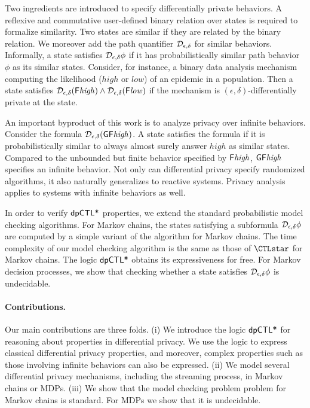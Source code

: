 
Two ingredients are introduced to specify differentially private
behaviors. A reflexive and commutative user-defined binary relation
over states is required to formalize similarity. Two states are
similar if they are related by the binary relation. We moreover add
the path quantifier $\mathcal{D}_{{\epsilon}, {\delta}}$ for similar
behaviors. Informally, a state satisfies $\mathcal{D}_{{\epsilon}, {\delta}}
\phi$ if it has probabilistically similar path behavior $\phi$ as
its similar states. Consider, for instance, a binary data analysis
mechanism computing the likelihood ($\mathit{high}$ or $\mathit{low}$)
of an epidemic in a population. Then a state satisfies
$\mathcal{D}_{{\epsilon}, {\delta}} (\mathsf{F} \mathit{high}) \wedge
\mathcal{D}_{{\epsilon}, {\delta}} (\mathsf{F} \mathit{low})$ if the mechanism is
$(\epsilon, \delta)$-differentially private at the state.


An important byproduct of this work is to analyze privacy over
infinite behaviors. Consider the formula $\mathcal{D}_{{\epsilon}, {\delta}}
(\mathsf{G} \mathsf{F} \mathit{high})$. A state satisfies the formula if it
is probabilistically similar to always almost surely
answer $\mathit{high}$ as similar states. Compared to the unbounded
but finite behavior specified by $\mathsf{F} \mathit{high}$,
$\mathsf{G} \mathsf{F} \mathit{high}$ specifies an infinite behavior.
Not only can differential privacy specify randomized algorithms, it
also naturally generalizes to reactive systems.
Privacy analysis applies to systems with infinite behaviors as well.


In order to verify $\textsf{dpCTL*}$ properties, we extend the standard
probabilistic model checking algorithms. For Markov chains, the states
satisfying a subformula $\mathcal{D}_{{\epsilon}, {\delta}} \phi$ are computed
by a simple variant of the algorithm for Markov chains.
The time complexity of our model checking algorithm is the same as
those of $\CTLstar$ for Markov chains. The logic $\textsf{dpCTL*}$ obtains its
expressiveness for free. 
For Markov decision processes, we show that checking whether a state
satisfies $\mathcal{D}_{{\epsilon}, {\delta}} \phi$ is undecidable.


\paragraph{Contributions.} Our main contributions are three folds. (i)
We introduce the logic $\textsf{dpCTL*}$ for reasoning about properties in 
differential privacy. We use the logic to express classical
differential privacy properties, and moreover, complex properties such as those 
involving infinite behaviors can also be expressed. (ii) We model several differential privacy mechanisms, including the streaming process, in Markov chains or MDPs.
(iii) We show that the model checking problem 
problem for Markov chains is standard. For MDPs we show that it is undecidable.  
